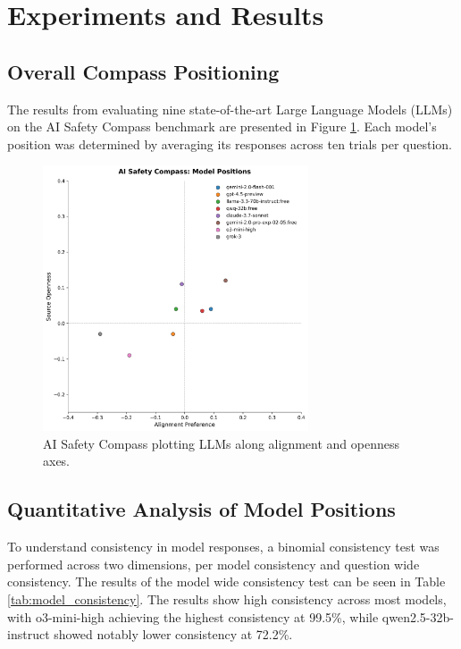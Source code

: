 \section{Experiments and Results}

\subsection{Overall Compass Positioning}

The results from evaluating nine state-of-the-art Large Language Models (LLMs) on the AI Safety Compass benchmark are presented in Figure \ref{fig:compass}. Each model's position was determined by averaging its responses across ten trials per question.

\begin{figure}[htbp]
    \centering
    \includegraphics[width=0.7\textwidth]{figures/compass_results.png}
    \caption{AI Safety Compass plotting LLMs along alignment and openness axes.}
    \label{fig:compass}
\end{figure}

\subsection{Quantitative Analysis of Model Positions}

To understand consistency in model responses, a binomial consistency test was performed across two dimensions, per model consistency and question wide consistency. The results of the model wide consistency test can be seen in Table \ref{tab:model_consistency}. The results show high consistency across most models, with o3-mini-high achieving the highest consistency at 99.5\%, while qwen2.5-32b-instruct showed notably lower consistency at 72.2\%.

